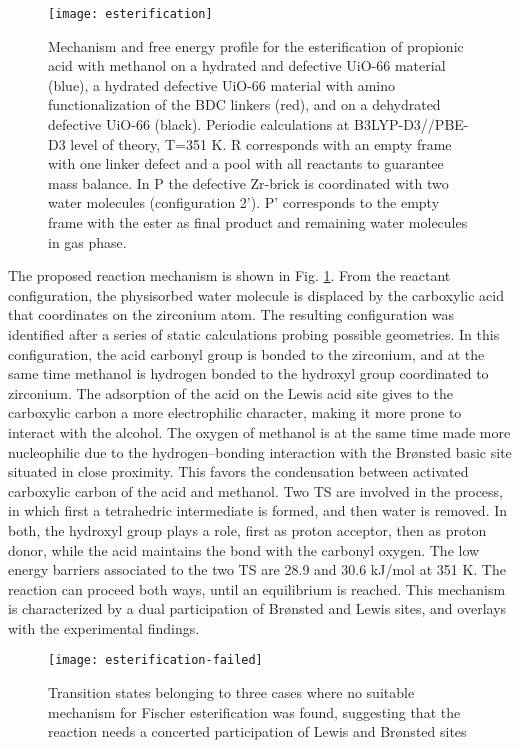 \begin{figure}[!htbp]
	\centering
	\texttt{[image: esterification]}
	\caption{Mechanism and free energy profile for the esterification of propionic acid with methanol on a hydrated and defective UiO-66 material (blue), a hydrated defective UiO-66 material with amino functionalization of the BDC linkers (red), and on a dehydrated defective UiO-66 (black). Periodic calculations at B3LYP-D3//PBE-D3 level of theory, T=351 K. R corresponds with an empty frame with one linker defect and a pool with all reactants to guarantee mass balance. In P the defective Zr-brick is coordinated with two water molecules (configuration 2’). P’ corresponds to the empty frame with the ester as final product and remaining water molecules in gas phase.}
	\label{fig:esterification}
\end{figure}
\npar
The proposed reaction mechanism is shown in Fig. \ref{fig:esterification}. From the reactant configuration, the physisorbed water molecule is displaced by the carboxylic acid that coordinates on the zirconium atom. The resulting configuration was identified after a series of static calculations probing possible geometries. In this configuration, the acid carbonyl group is bonded to the zirconium, and at the same time methanol is hydrogen bonded to the hydroxyl group coordinated to zirconium. The adsorption of the acid on the Lewis acid site gives to the carboxylic carbon a more electrophilic character, making it more prone to interact with the alcohol. The oxygen of methanol is at the same time made more nucleophilic due to the hydrogen--bonding interaction with the Br\o{}nsted basic site situated in close proximity. This favors the condensation between activated carboxylic carbon of the acid and methanol. Two TS are involved in the process, in which first a tetrahedric intermediate is formed, and then water is removed. In both, the hydroxyl group plays a role, first as proton acceptor, then as proton donor, while the acid maintains the bond with the carbonyl oxygen. The low energy barriers associated to the two TS are 28.9 and 30.6 kJ/mol at 351 K. The reaction can proceed both ways, until an equilibrium is reached. This mechanism is characterized by a dual participation of Br\o{}nsted and Lewis sites, and overlays with the experimental findings.
\npar
\begin{figure}[!htbp]
	\centering
	\texttt{[image: esterification-failed]}
	\caption{Transition states belonging to three cases where no suitable mechanism for Fischer esterification was found, suggesting that the reaction needs a concerted participation of Lewis and Br\o{}nsted sites}
	\label{fig:esterification-failed}
\end{figure}
